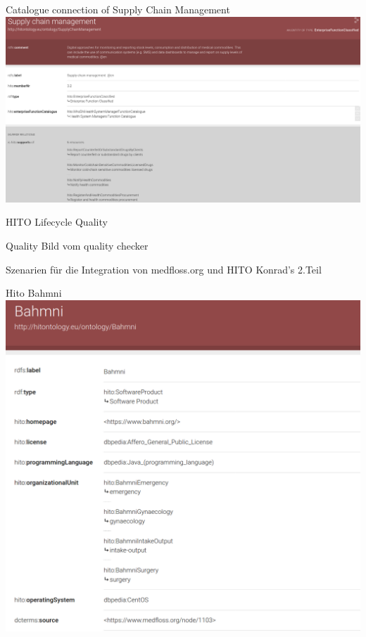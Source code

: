 \documentclass[aspectratio=1610,12pt]{beamer}
\begin{document}
\begin{frame}{Catalogue connection of Supply Chain Management}
  \includegraphics[width=\textwidth]{img/supplychainmanagement.png}
\end{frame}

\begin{frame}{HITO Lifecycle Quality}
  \centering
  \vspace{-0.5cm}
\end{frame}


\begin{frame}{Quality}
  Bild vom quality checker
\end{frame}

\begin{frame}{Szenarien für die Integration von medfloss.org und HITO}
  \centering
  \huge Konrad's 2.Teil
\end{frame}

\begin{frame}{Hito Bahmni}
  \includegraphics[width=\textwidth]{img/hito-bahmni.png}
\end{frame}
\end{document}
